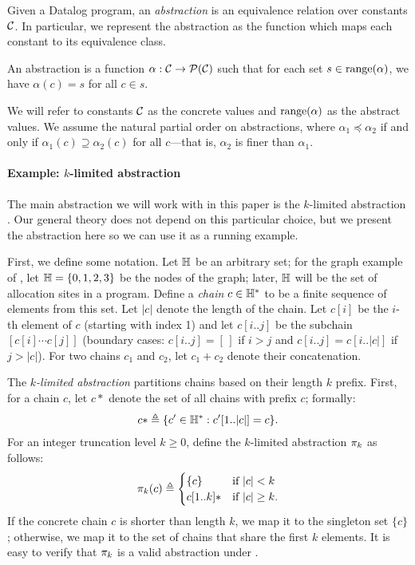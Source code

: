 Given a Datalog program, an {\em abstraction} is an equivalence relation over
constants $\mathcal{C}$.  In particular, we represent the abstraction as the
function which maps each constant to its equivalence class.
\begin{definition}
\label{def:abstraction}
An abstraction is a function $\alpha : \mathcal{C} \to \mathcal{P}(\mathcal{C})$
such that for each set $s \in \text{\rm range}(\alpha)$,
we have $\alpha(c) = s$ for all $c \in s$.
\end{definition}
\noindent
We will refer to constants $\mathcal{C}$ as the concrete values and $\text{\rm range}(\alpha)$ as
the abstract values.
We assume the natural partial order on abstractions,
where $\alpha_1 \preceq \alpha_2$ if and only if $\alpha_1(c) \supseteq \alpha_2(c)$ for all $c$---that is, $\alpha_2$ is finer than $\alpha_1$.

\paragraph{Example: $k$-limited abstraction}

The main abstraction we will work with in this paper is the $k$-limited abstraction \cite{kcfa,kobj}.
Our general theory does not depend on this particular choice, but we present
the abstraction here so we can use it as a running example.

First, we define some notation.
Let ${\mathbb H}$ be an arbitrary set;
for the graph example of , let ${\mathbb H} = \{ 0, 1, 2, 3 \}$ be the nodes of the graph;
later, ${\mathbb H}$ will be the set of allocation sites in a program.
Define a {\em chain} $c \in {\mathbb H}^*$ to be a finite sequence of elements from this set.
Let $|c|$ denote the length of the chain.
Let $c[i]$ be the $i$-th element of $c$ (starting with index 1) and
let $c[i..j]$ be the subchain $[c[i] \cdots c[j]]$
(boundary cases: $c[i..j] = [\,]$ if $i > j$ and $c[i..j] = c[i..|c|]$ if $j > |c|$).
For two chains $c_1$ and $c_2$, let $c_1+c_2$ denote their concatenation.

The {\em $k$-limited abstraction}
partitions chains based on their length $k$ prefix.
First, for a chain $c$, let $c*$ denote the set of all chains
with prefix $c$; formally:
\begin{align}
c* \triangleq \{ c' \in {\mathbb H}^* : c'[1..|c|] = c \}.
\end{align}
For an integer truncation level $k \ge 0$, define the $k$-limited abstraction $\pi_k$ as follows:
\begin{align}
\label{eqn:klimitedAbstraction}
\pi_k(c) \triangleq
\begin{cases}
\{c\}     & \text{if $|c| < k$} \\
c[1..k]*  & \text{if $|c| \ge k$}. \\
\end{cases}
\end{align}
If the concrete chain $c$ is shorter than length $k$,
we map it to the singleton set $\{ c \}$;
otherwise, we map it to the set of chains that share the first $k$ elements.
It is easy to verify that $\pi_k$ is a valid abstraction under .

